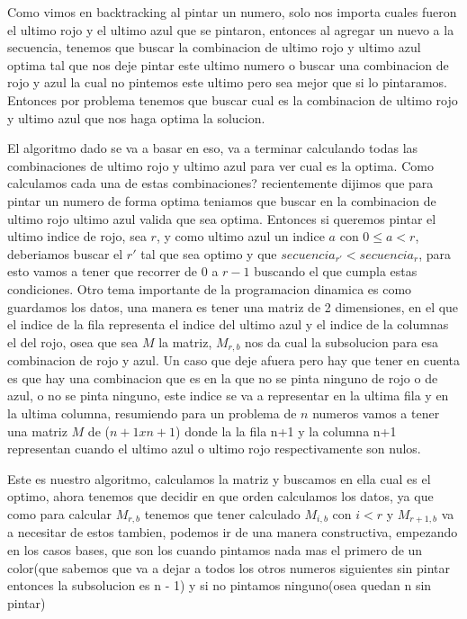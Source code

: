 Como vimos en backtracking al pintar un numero, solo nos importa cuales fueron el ultimo rojo y el ultimo azul que se pintaron, entonces al agregar un nuevo a la secuencia, tenemos que buscar la combinacion de ultimo rojo y ultimo azul optima tal que nos deje pintar este ultimo numero o buscar una combinacion de rojo y azul la cual no pintemos este ultimo pero sea mejor que si lo pintaramos. Entonces por problema tenemos que buscar cual es la combinacion de ultimo rojo y ultimo azul que nos haga optima la solucion.

El algoritmo dado se va a basar en eso, va a terminar calculando todas las combinaciones de ultimo rojo y ultimo azul para ver cual es la optima. Como calculamos cada una de estas combinaciones? recientemente dijimos que para pintar un numero de forma optima teniamos que buscar en la combinacion de ultimo rojo ultimo azul valida que sea optima. Entonces si queremos pintar el ultimo indice de rojo, sea $r$, y como ultimo azul un indice $a$ con $0 \leq a < r$, deberiamos buscar el $r'$ tal que sea optimo y que $secuencia_{r'} < secuencia_r$, para esto vamos a tener que recorrer de $0$ a $r-1$ buscando el que cumpla estas condiciones.
Otro tema importante de la programacion dinamica es como guardamos los datos, una manera es tener una matriz de 2 dimensiones, en el que el indice de la fila representa el indice del ultimo azul y el indice de la columnas el del rojo, osea que sea $M$ la matriz, $M_{r,b}$ nos da cual la subsolucion para esa combinacion de rojo y azul. Un caso que deje afuera pero hay que tener en cuenta es que hay una combinacion que es en la que no se pinta ninguno de rojo o de azul, o no se pinta ninguno, este indice se va a representar en la ultima fila y en la ultima columna, resumiendo para un problema de $n$ numeros vamos a tener una matriz $M$ de ($n+1 x n+1$) donde la la fila n+1 y la columna n+1 representan cuando el ultimo azul o ultimo rojo respectivamente son nulos.

Este es nuestro algoritmo, calculamos la matriz y buscamos en ella cual es el optimo, ahora tenemos que decidir en que orden calculamos los datos, ya que como para calcular $M_{r,b}$ tenemos que tener calculado $M_{i,b}$ con $i<r$ y $M_{r+1,b}$ va a necesitar de estos tambien, podemos ir de una manera constructiva, empezando en los casos bases, que son los cuando pintamos nada mas el primero de un color(que sabemos que va a dejar a todos los otros numeros siguientes sin pintar entonces la subsolucion es n - 1) y si no pintamos ninguno(osea quedan n sin pintar)
